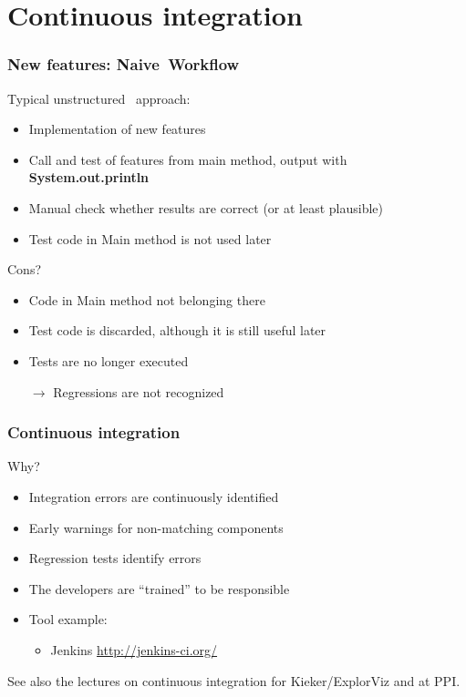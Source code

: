 \section{Continuous integration}\label{ssec:ci}


\begin{frame}
 \frametitle{New features: \glqq Naive\grqq\ Workflow}
 
Typical  \glqq unstructured \grqq\ approach:
\begin{itemize}
   \item Implementation of new features
   \item Call and test of features from main method, output with \textbf{System.out.println}
   \item Manual check whether results are correct (or at least plausible)
   \item Test code in Main method is not used later
\end{itemize}
 
 \pause
 
Cons?
 \begin{itemize}
	 \item Code in Main method not  \glqq belonging there\grqq
		\item Test code is discarded, although it is still useful later
		\item Tests are no longer executed
   \item[$\rightarrow$] Regressions are not recognized
\end{itemize}
\end{frame}


\begin{frame}
\frametitle{Continuous integration}
Why?
\begin{itemize}
  \item Integration errors are continuously identified
  \item Early warnings for non-matching components
  \item Regression tests identify errors
  \item The developers are "`trained"' to be responsible
  \item Tool example:
  \begin{itemize}
	\item Jenkins \url{http://jenkins-ci.org/}
  \end{itemize}
\end{itemize}

\vfill

See also the lectures on continuous integration for Kieker/ExplorViz and at PPI.
\end{frame}

